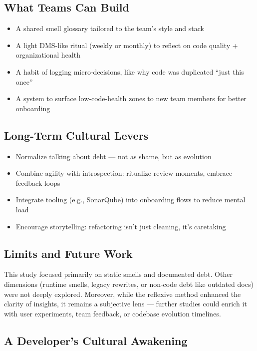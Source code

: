 \subsection{What Teams Can Build}

\begin{itemize}
    \item A shared smell glossary tailored to the team's style and stack
    \item A light DMS-like ritual (weekly or monthly) to reflect on code quality + organizational health
    \item A habit of logging micro-decisions, like why code was duplicated “just this once”
    \item A system to surface low-code-health zones to new team members for better onboarding
\end{itemize}

\subsection{Long-Term Cultural Levers}

\begin{itemize}
    \item Normalize talking about debt — not as shame, but as evolution
    \item Combine agility with introspection: ritualize review moments, embrace feedback loops
    \item Integrate tooling (e.g., SonarQube) into onboarding flows to reduce mental load
    \item Encourage storytelling: refactoring isn't just cleaning, it's caretaking
\end{itemize}

\subsection{Limits and Future Work}

This study focused primarily on static smells and documented debt. Other dimensions (runtime smells, legacy rewrites, or non-code debt like outdated docs) were not deeply explored. Moreover, while the reflexive method enhanced the clarity of insights, it remains a subjective lens — further studies could enrich it with user experiments, team feedback, or codebase evolution timelines.

\subsection{A Developer’s Cultural Awakening}

